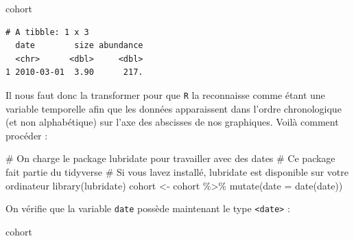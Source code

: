 \documentclass[
  a4paper,
  DIV=11,
  numbers=noendperiod,
  oneside]{scrreprt}
\newenvironment{Shaded}{}{}
\newcommand{\AttributeTok}[1]{\textcolor[rgb]{0.84,0.23,0.29}{#1}}
\newcommand{\CommentTok}[1]{\textcolor[rgb]{0.42,0.45,0.49}{#1}}
\newcommand{\FunctionTok}[1]{\textcolor[rgb]{0.44,0.26,0.76}{#1}}
\newcommand{\NormalTok}[1]{\textcolor[rgb]{0.14,0.16,0.18}{#1}}
\newcommand{\OtherTok}[1]{\textcolor[rgb]{0.44,0.26,0.76}{#1}}
\newcommand{\SpecialCharTok}[1]{\textcolor[rgb]{0.00,0.36,0.77}{#1}}
\begin{document}
\begin{Shaded}
\begin{Highlighting}[]
\NormalTok{cohort}
\end{Highlighting}
\end{Shaded}

\begin{verbatim}
# A tibble: 1 x 3
  date        size abundance
  <chr>      <dbl>     <dbl>
1 2010-03-01  3.90      217.
\end{verbatim}

Il nous faut donc la transformer pour que \texttt{R} la reconnaisse
comme étant une variable temporelle afin que les données apparaissent
dans l'ordre chronologique (et non alphabétique) sur l'axe des abscisses
de nos graphiques. Voilà comment procéder :

\begin{Shaded}
\begin{Highlighting}[]
\CommentTok{\# On charge le package lubridate pour travailler avec des dates}
\CommentTok{\# Ce package fait partie du tidyverse}
\CommentTok{\# Si vous l\textquotesingle{}avez installé, lubridate est disponible sur votre ordinateur}
\FunctionTok{library}\NormalTok{(lubridate)}
\NormalTok{cohort }\OtherTok{\textless{}{-}}\NormalTok{ cohort }\SpecialCharTok{\%\textgreater{}\%}
  \FunctionTok{mutate}\NormalTok{(}\AttributeTok{date =} \FunctionTok{date}\NormalTok{(date))}
\end{Highlighting}
\end{Shaded}


On vérifie que la variable \texttt{date} possède maintenant le type
\texttt{\textless{}date\textgreater{}} :

\begin{Shaded}
\begin{Highlighting}[]
\NormalTok{cohort}
\end{Highlighting}
\end{Shaded}
\end{document}
